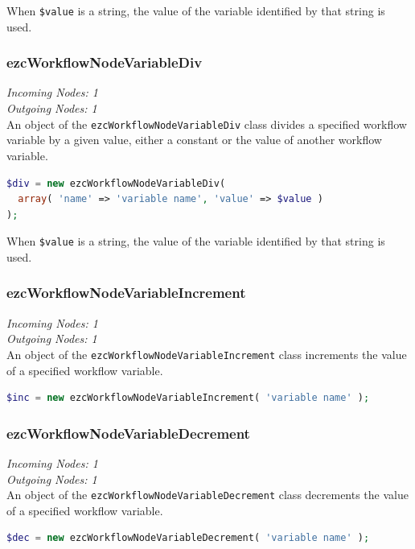 When \texttt{\$value} is a string, the value of the variable identified by
that string is used.

\subsubsection{ezcWorkflowNodeVariableDiv}

\emph{Incoming Nodes: 1}\\
\emph{Outgoing Nodes: 1}\\

An object of the \texttt{ezcWorkflowNodeVariableDiv} class divides a specified
workflow variable by a given value, either a constant or the value of another
workflow variable.

\begin{lstlisting}[language=PHP]
$div = new ezcWorkflowNodeVariableDiv(
  array( 'name' => 'variable name', 'value' => $value )
);
\end{lstlisting}

When \texttt{\$value} is a string, the value of the variable identified by
that string is used.

\subsubsection{ezcWorkflowNodeVariableIncrement}

\emph{Incoming Nodes: 1}\\
\emph{Outgoing Nodes: 1}\\

An object of the \texttt{ezcWorkflowNodeVariableIncrement} class increments
the value of a specified workflow variable.

\begin{lstlisting}[language=PHP]
$inc = new ezcWorkflowNodeVariableIncrement( 'variable name' );
\end{lstlisting}

\subsubsection{ezcWorkflowNodeVariableDecrement}

\emph{Incoming Nodes: 1}\\
\emph{Outgoing Nodes: 1}\\

An object of the \texttt{ezcWorkflowNodeVariableDecrement} class decrements
the value of a specified workflow variable.

\begin{lstlisting}[language=PHP]
$dec = new ezcWorkflowNodeVariableDecrement( 'variable name' );
\end{lstlisting}

